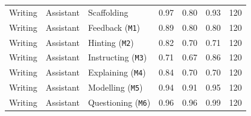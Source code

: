 \begin{table}[t]
{\begin{tabular}{lllrrrr}
Writing & Assistant & Scaffolding & 0.97 & 0.80 & 0.93 & 120 \\
Writing & Assistant & Feedback (\texttt{M1}) & 0.89 & 0.80 & 0.80 & 120 \\
Writing & Assistant & Hinting (\texttt{M2}) & 0.82 & 0.70 & 0.71 & 120 \\
Writing & Assistant & Instructing (\texttt{M3}) & 0.71 & 0.67 & 0.86 & 120 \\
Writing & Assistant & Explaining (\texttt{M4}) & 0.84 & 0.70 & 0.70 & 120 \\
Writing & Assistant & Modelling (\texttt{M5}) & 0.94 & 0.91 & 0.95 & 120 \\
Writing & Assistant & Questioning (\texttt{M6}) & 0.96 & 0.96 & 0.99 & 120 \\
\bottomrule
\end{tabular}%
}
\end{table}
